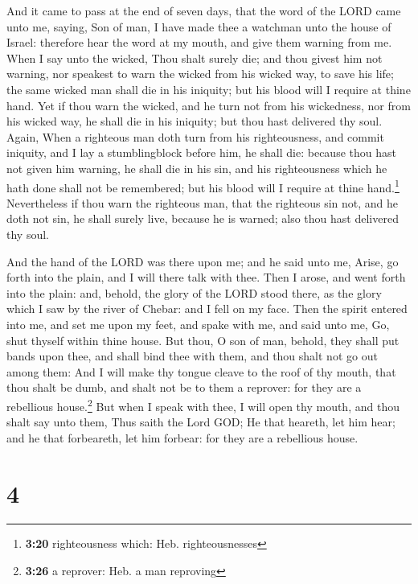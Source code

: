  And it came to pass at the end of seven days, that the
word of the LORD came unto me, saying,  Son of man, I
have made thee a watchman unto the house of Israel: therefore hear the
word at my mouth, and give them warning from me.  When I
say unto the wicked, Thou shalt surely die; and thou givest him not
warning, nor speakest to warn the wicked from his wicked way, to save
his life; the same wicked man shall die in his iniquity; but his blood
will I require at thine hand.  Yet if thou warn the
wicked, and he turn not from his wickedness, nor from his wicked way, he
shall die in his iniquity; but thou hast delivered thy soul.
 Again, When a righteous man doth turn from his
righteousness, and commit iniquity, and I lay a stumblingblock before
him, he shall die: because thou hast not given him warning, he shall die
in his sin, and his righteousness which he hath done shall not be
remembered; but his blood will I require at thine hand.\footnote{\textbf{3:20}
  righteousness which: Heb. righteousnesses} 
Nevertheless if thou warn the righteous man, that the righteous sin not,
and he doth not sin, he shall surely live, because he is warned; also
thou hast delivered thy soul.

 And the hand of the LORD was there upon me; and he said
unto me, Arise, go forth into the plain, and I will there talk with
thee.  Then I arose, and went forth into the plain: and,
behold, the glory of the LORD stood there, as the glory which I saw by
the river of Chebar: and I fell on my face.  Then the
spirit entered into me, and set me upon my feet, and spake with me, and
said unto me, Go, shut thyself within thine house.  But
thou, O son of man, behold, they shall put bands upon thee, and shall
bind thee with them, and thou shalt not go out among them:
 And I will make thy tongue cleave to the roof of thy
mouth, that thou shalt be dumb, and shalt not be to them a reprover: for
they are a rebellious house.\footnote{\textbf{3:26} a reprover: Heb. a
  man reproving}  But when I speak with thee, I will open
thy mouth, and thou shalt say unto them, Thus saith the Lord GOD; He
that heareth, let him hear; and he that forbeareth, let him forbear: for
they are a rebellious house.

\hypertarget{section-3}{%
\section{4}\label{section-3}}

